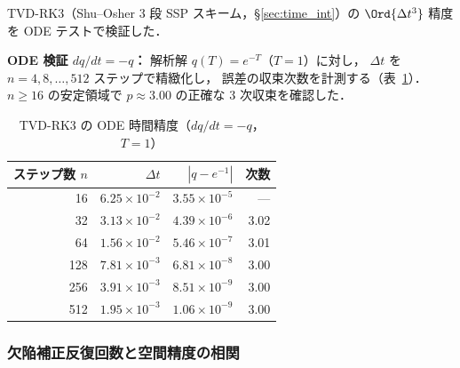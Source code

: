 TVD-RK3（Shu--Osher 3 段 SSP スキーム，§\ref{sec:time_int}）の
$\Ord{\Delta t^3}$ 精度を ODE テストで検証した．

\textbf{ODE 検証 $dq/dt = -q$：}
解析解 $q(T) = e^{-T}$（$T = 1$）に対し，
$\Delta t$ を $n = 4, 8, \ldots, 512$ ステップで精緻化し，
誤差の収束次数を計測する（表~\ref{tab:tvd_rk3_ode}）．
$n \geq 16$ の安定領域で $p \approx 3.00$ の正確な 3 次収束を確認した．

\begin{table}[htbp]
\centering
\caption{TVD-RK3 の ODE 時間精度（$dq/dt = -q$，$T = 1$）}
\label{tab:tvd_rk3_ode}
\begin{tabular}{rrrr}
\toprule
ステップ数 $n$ & $\Delta t$ & $|q - e^{-1}|$ & 次数 \\
\midrule
  16 & $6.25 \times 10^{-2}$ & $3.55 \times 10^{-5}$  & ---  \\
  32 & $3.13 \times 10^{-2}$ & $4.39 \times 10^{-6}$  & 3.02 \\
  64 & $1.56 \times 10^{-2}$ & $5.46 \times 10^{-7}$  & 3.01 \\
 128 & $7.81 \times 10^{-3}$ & $6.81 \times 10^{-8}$  & 3.00 \\
 256 & $3.91 \times 10^{-3}$ & $8.51 \times 10^{-9}$  & 3.00 \\
 512 & $1.95 \times 10^{-3}$ & $1.06 \times 10^{-9}$  & 3.00 \\
\bottomrule
\end{tabular}
\end{table}

\subsubsection{欠陥補正反復回数と空間精度の相関}
\label{sec:dc_iteration_accuracy}


